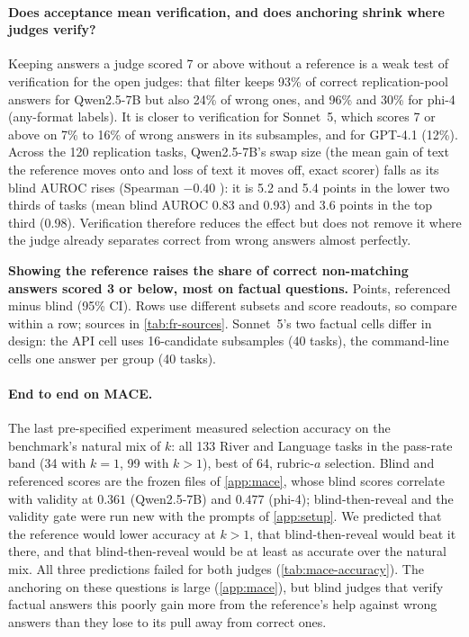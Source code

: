\paragraph{Does acceptance mean verification, and does anchoring shrink where judges verify?}
Keeping answers a judge scored 7 or above without a reference is a weak test of verification for the open judges: that filter keeps 93\% of correct replication-pool answers for Qwen2.5-7B but also 24\% of wrong ones, and 96\% and 30\% for phi-4 (any-format labels). It is closer to verification for Sonnet~5, which scores 7 or above on 7\% to 16\% of wrong answers in its subsamples, and for GPT-4.1 (12\%). Across the 120 replication tasks, Qwen2.5-7B's swap size (the mean gain of text the reference moves onto and loss of text it moves off, exact scorer) falls as its blind AUROC rises (Spearman $-0.40$ ): it is 5.2 and 5.4 points in the lower two thirds of tasks (mean blind AUROC 0.83 and 0.93) and 3.6 points in the top third (0.98). Verification therefore reduces the effect but does not remove it where the judge already separates correct from wrong answers almost perfectly.\ph

\begin{table}[htbp]
\centering
\small
\caption{\textbf{Showing the reference raises the share of correct non-matching answers scored 3 or below, most on factual questions.} Points, referenced minus blind (95\% CI). Rows use different subsets and score readouts, so compare within a row; sources in \cref{tab:fr-sources}. Sonnet~5's two factual cells differ in design: the API cell uses 16-candidate subsamples (40 tasks), the command-line cells one answer per group (40 tasks).}
\label{tab:false-reject}
\setlength{\tabcolsep}{4pt}
\begin{adjustbox}{max width=\linewidth}\end{adjustbox}
\end{table}

\paragraph{End to end on \textsc{MACE}.}
The last pre-specified experiment measured selection accuracy on the benchmark's natural mix of $k$: all 133 River and Language tasks in the pass-rate band (34 with $k{=}1$, 99 with $k{>}1$), best of 64, rubric-$a$ selection. Blind and referenced scores are the frozen files of \cref{app:mace}, whose blind scores correlate with validity at $0.361$ (Qwen2.5-7B) and $0.477$ (phi-4); blind-then-reveal and the validity gate were run new with the prompts of \cref{app:setup}. We predicted that the reference would lower accuracy at $k{>}1$, that blind-then-reveal would beat it there, and that blind-then-reveal would be at least as accurate over the natural mix. All three predictions failed for both judges (\cref{tab:mace-accuracy}). The anchoring on these questions is large (\cref{app:mace}), but blind judges that verify factual answers this poorly gain more from the reference's help against wrong answers than they lose to its pull away from correct ones.

